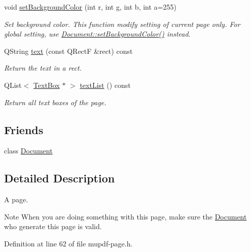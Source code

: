 \begin{DoxyCompactItemize}
void \hyperlink{class_mu_p_d_f_1_1_page_a4f16778c9c61692834644d298b6ee77f}{set\-Background\-Color} (int r, int g, int b, int a=255)
\begin{DoxyCompactList}\small\item\em Set background color. This function modify setting of current page only. For global setting, use \hyperlink{class_mu_p_d_f_1_1_document_a0b9669def894d9164543e3367ae11d21}{Document\-::set\-Background\-Color()} instead. \end{DoxyCompactList}\item 
Q\-String \hyperlink{class_mu_p_d_f_1_1_page_a8a4a0cb44db0035c53fe4aca7cf0dbc0}{text} (const Q\-Rect\-F \&rect) const 
\begin{DoxyCompactList}\small\item\em Return the text in a rect. \end{DoxyCompactList}\item 
Q\-List$<$ \hyperlink{class_mu_p_d_f_1_1_text_box}{Text\-Box} $\ast$ $>$ \hyperlink{class_mu_p_d_f_1_1_page_a357731345081db20d209685a50cca27a}{text\-List} () const 
\begin{DoxyCompactList}\small\item\em Return all text boxes of the page. \end{DoxyCompactList}\end{DoxyCompactItemize}
\subsection*{Friends}
\begin{DoxyCompactItemize}
\item 
class \hyperlink{class_mu_p_d_f_1_1_page_a883538034e58fc5c0de7d4e4cab3cef7}{Document}
\end{DoxyCompactItemize}


\subsection{Detailed Description}
A page. 

\begin{DoxyNote}{Note}
When you are doing something with this page, make sure the \hyperlink{class_mu_p_d_f_1_1_document}{Document} who generate this page is valid. 
\end{DoxyNote}


Definition at line 62 of file mupdf-\/page.\-h.



